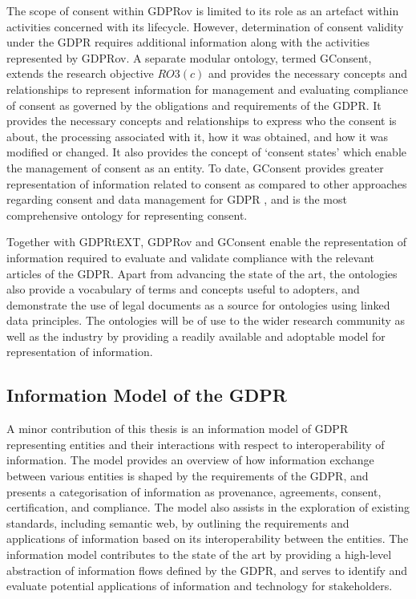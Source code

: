 The scope of consent within GDPRov is limited to its role as an artefact within activities concerned with its lifecycle. However, determination of consent validity under the GDPR requires additional information \cite{politou_forgetting_2018,article_29_data_protection_working_party_guidelines_2018} along with the activities represented by GDPRov. A separate modular ontology, termed GConsent, extends the research objective $RO3(c)$ and provides the necessary concepts and relationships to represent information for management and evaluating compliance of consent as governed by the obligations and requirements of the GDPR. It provides the necessary concepts and relationships to express who the consent is about, the processing associated with it, how it was obtained, and how it was modified or changed. It also provides the concept of `consent states' which enable the management of consent as an entity. To date, GConsent provides greater representation of information related to consent as compared to other approaches regarding consent and data management for GDPR \cite{peras_guidelines_2018}, and is the most comprehensive ontology for representing consent.

Together with GDPRtEXT, GDPRov and GConsent enable the representation of information required to evaluate and validate compliance with the relevant articles of the GDPR. Apart from advancing the state of the art, the ontologies also provide a vocabulary of terms and concepts useful to adopters, and demonstrate the use of legal documents as a source for ontologies using linked data principles. The ontologies will be of use to the wider research community as well as the industry by providing a readily available and adoptable model for representation of information.

\subsection{Information Model of the GDPR}
A minor contribution of this thesis is an information model of GDPR representing entities and their interactions with respect to interoperability of information. The model provides an overview of how information exchange between various entities is shaped by the requirements of the GDPR, and presents a categorisation of information as provenance, agreements, consent, certification, and compliance. The model also assists in the exploration of existing standards, including semantic web, by outlining the requirements and applications of information based on its interoperability between the entities. The information model contributes to the state of the art by providing a high-level abstraction of information flows defined by the GDPR, and serves to identify and evaluate potential applications of information and technology for stakeholders.

